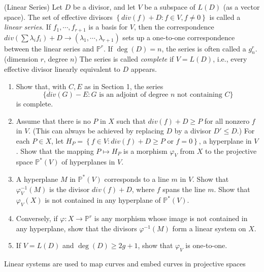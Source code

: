 \documentclass{solution}
\begin{document}
\begin{problem}{8.33}
    (Linear Series) Let $D$ be a divisor, and let $V$ be a subspace of $L(D)$ (as a vector space). The set of effective divisors $\left\lbrace div(f) + D: f \in V, f \ne 0 \right\rbrace$  is called a \textit{linear series}. If $f_1, \cdots, f_{r + 1}$ is a basis for $V$, then the correspondence $div(\sum \lambda_i f_i) + D \rightarrow (\lambda_1, \cdots, \lambda_{r + 1})$ sets up a one-to-one correspondence between the linear series and $\mathbb{P}^r$. If $\deg(D) = n$, the series is often called a $g_n^r$. (dimension $r$, degree $n$) The series is called \textit{complete} if $V = L(D)$, i.e., every effective divisor linearly equivalent to $D$ appears.

    \begin{enumerate}
        \item Show that, with $C, E$ as in Section 1, the series
        $$\lbrace div(G) - E: G \text{ is an adjoint of degree $n$ not containing $C$} \rbrace$$
        is complete.
        \item Assume that there is no $P$ in $X$ such that $div(f) + D \ge P$ for all nonzero $f$ in $V$. (This can always be achieved by replacing $D$ by a divisor $D' \le D$.) For each $P \in X$, let $H_P = \left\lbrace f \in V: div(f) + D \ge P \text{ or } f = 0 \right\rbrace$, a hyperplane in $V$. Show that the mapping $P \mapsto H_P$ is a morphism $\varphi_V$ from $X$ to the projective space $\mathbb{P}^*(V)$ of hyperplanes in $V$.
        \item A hyperplane $M$ in $\mathbb{P}^*(V)$ corresponds to a line $m$ in $V$. Show that $\varphi_V ^{-1}(M)$ is the divisor $div(f) + D$, where $f$ spans the line $m$. Show that $\varphi_V(X)$ is not contained in any hyperplane of $\mathbb{P}^*(V)$.
        \item Conversely, if $\varphi: X \rightarrow \mathbb{P}^r$ is any morphism whose image is not contained in any hyperplane, show that the divisors $\varphi ^{-1}(M)$ form a linear system on $X$.
        \item If $V = L(D)$ and $\deg(D) \ge 2g + 1$, show that $\varphi_V$ is one-to-one.
    \end{enumerate}

    Linear systems are used to map curves and embed curves in projective spaces
\end{problem}
\end{document}
